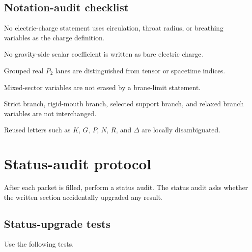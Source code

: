 \subsection{Notation-audit checklist}
\label{subsec:notation-audit-checklist}

\begin{verificationchecklist}
\item No electric-charge statement uses circulation, throat radius, or breathing variables as the charge definition.
\item No gravity-side scalar coefficient is written as bare electric charge.
\item Grouped real \(P_2\) lanes are distinguished from tensor or spacetime indices.
\item Mixed-sector variables are not erased by a brane-limit statement.
\item Strict branch, rigid-mouth branch, selected support branch, and relaxed branch variables are not interchanged.
\item Reused letters such as \(K\), \(G\), \(P\), \(N\), \(R\), and \(\Delta\) are locally disambiguated.
\end{verificationchecklist}

\section{Status-audit protocol}
\label{sec:status-audit-protocol}

After each packet is filled, perform a status audit.  The status audit asks whether the written section accidentally upgraded any result.

\subsection{Status-upgrade tests}
\label{subsec:status-upgrade-tests}

Use the following tests.

